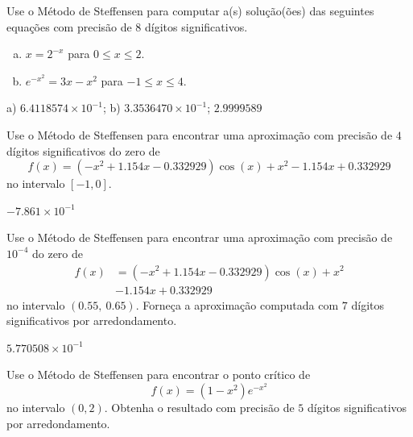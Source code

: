 \begin{exer}
  Use o Método de Steffensen para computar a(s) solução(ões) das seguintes equações com precisão de 8 dígitos significativos.
  \begin{enumerate}[a)]
  \item $x = 2^{-x}$ para $0\leq x \leq 2$.
  \item $e^{-x^2} = 3x - x^2$ para $-1\leq x\leq 4$.
  \end{enumerate}
\end{exer}
\begin{resp}
  a) $6.4118574\times 10^{-1}$; b) $3.3536470\times 10^{-1}$; $2.9999589$
\end{resp}

\begin{exer}
  Use o Método de Steffensen para encontrar uma aproximação com precisão de $4$ dígitos significativos do zero de 
  \begin{equation}
    f(x) = (-x^2+1.154x-0.332929)\cos(x) + x^2 - 1.154x + 0.332929
  \end{equation}
  no intervalo $[-1, 0]$.
\end{exer}
\begin{resp}
  $-7.861\times 10^{-1}$
\end{resp}

\begin{exer}
  Use o Método de Steffensen para encontrar uma aproximação com precisão de $10^{-4}$ do zero de
  \begin{equation}
    \begin{aligned}
      f(x) &= (-x^2+1.154x-0.332929)\cos(x) + x^2 \\
      &- 1.154x + 0.332929
  \end{aligned}
  \end{equation}
no intervalo $(0.55, ~0.65)$. Forneça a aproximação computada com $7$ dígitos significativos por arredondamento.
\end{exer}
\begin{resp}
  $5.770508\times 10^{-1}$
\end{resp}

\begin{exer}
  Use o Método de Steffensen para encontrar o ponto crítico de
  \begin{equation}
    f(x) = (1-x^2)e^{-x^2}
  \end{equation}
  no intervalo $(0, 2)$. Obtenha o resultado com precisão de $5$ dígitos significativos por arredondamento.
\end{exer}

